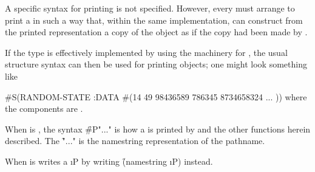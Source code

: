\endsubsubsection%

\endsubsubsection%
                                                                       
A specific syntax for printing   is
not specified. However, every 
must arrange to print a   in such a way that,
within the same implementation, 
can construct from the printed representation a copy of the 
object as if the copy had been made by .

If the type  is effectively implemented 
by using the machinery for ,
the usual structure syntax can then be used for printing 
objects; one might look something like

\code
 #S(RANDOM-STATE :DATA #(14 49 98436589 786345 8734658324 ... ))
\endcode
where the components are .

\endsubsubsection%

 
When  is , the syntax \f{\#P"..."} is how a
 is printed by  and the other functions herein described.
The \f{"..."} is the namestring representation of the pathname.
 
%

When  is 
 writes a  \i{P}
by writing \f{(namestring \i{P})} instead.

